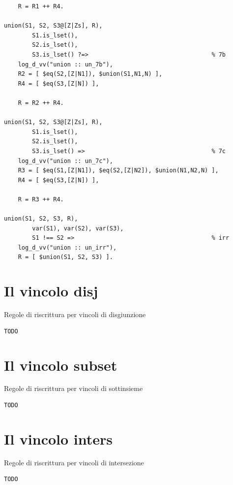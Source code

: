 \documentclass[12pt,a4paper,openright]{book} %
\begin{document}
\begin{verbatim}
    R = R1 ++ R4.

union(S1, S2, S3@[Z|Zs], R),
        S1.is_lset(),
        S2.is_lset(),
        S3.is_lset() ?=>                                   % 7b
    log_d_vv("union :: un_7b"),
    R2 = [ $eq(S2,[Z|N1]), $union(S1,N1,N) ],
    R4 = [ $eq(S3,[Z|N]) ],

    R = R2 ++ R4.

union(S1, S2, S3@[Z|Zs], R),
        S1.is_lset(),
        S2.is_lset(),
        S3.is_lset() =>                                    % 7c
    log_d_vv("union :: un_7c"),
    R3 = [ $eq(S1,[Z|N1]), $eq(S2,[Z|N2]), $union(N1,N2,N) ],
    R4 = [ $eq(S3,[Z|N]) ],

    R = R3 ++ R4.

union(S1, S2, S3, R),
        var(S1), var(S2), var(S3),
        S1 !== S2 =>                                       % irr
    log_d_vv("union :: un_irr"),
    R = [ $union(S1, S2, S3) ].
\end{verbatim}

\section{Il vincolo disj}

\begin{algorithm}[H]
	\caption{Regole di riscrittura per vincoli di disgiunzione}
	\label{alg:disj_constraints}
\end{algorithm}
\begin{verbatim}
TODO
\end{verbatim}


\section{Il vincolo subset}

\begin{algorithm}[H]
	\caption{Regole di riscrittura per vincoli di sottinsieme}
	\label{alg:subset_constraints}
\end{algorithm}
\begin{verbatim}
TODO
\end{verbatim}


\section{Il vincolo inters}

\begin{algorithm}[H]
	\caption{Regole di riscrittura per vincoli di intersezione}
	\label{alg:inters_constraints}
\end{algorithm}
\begin{verbatim}
TODO
\end{verbatim}
\end{document}
